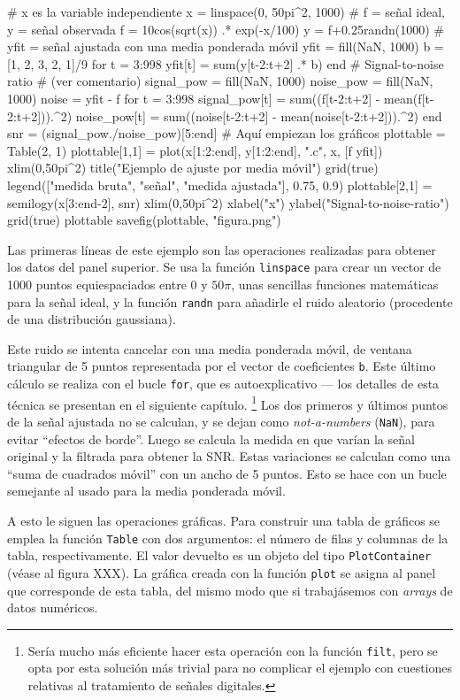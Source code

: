 ﻿\documentclass{article}
\newcommand{\jl}{\texttt}
\begin{document}
# x es la variable independiente
x = linspace(0, 50pi^2, 1000)
# f = señal ideal, y = señal observada
f = 10cos(sqrt(x)) .* exp(-x/100)
y = f+0.25randn(1000)
# yfit = señal ajustada con una media ponderada móvil
yfit = fill(NaN, 1000)
b = [1, 2, 3, 2, 1]/9
for t = 3:998
  yfit[t] = sum(y[t-2:t+2] .* b)
end
# Signal-to-noise ratio
# (ver comentario)
signal_pow = fill(NaN, 1000)
noise_pow = fill(NaN, 1000)
noise = yfit - f
for t = 3:998
  signal_pow[t] = sum((f[t-2:t+2] - mean(f[t-2:t+2])).^2)
  noise_pow[t] = sum((noise[t-2:t+2] - mean(noise[t-2:t+2])).^2)
end
snr = (signal_pow./noise_pow)[5:end]
# Aquí empiezan los gráficos
plottable = Table(2, 1)
plottable[1,1] = plot(x[1:2:end], y[1:2:end], ".c", x, [f yfit])
xlim(0,50pi^2)
title("Ejemplo de ajuste por media móvil")
grid(true)
legend(["medida bruta", "señal", "medida ajustada"], 0.75, 0.9)
plottable[2,1] = semilogy(x[3:end-2], snr)
xlim(0,50pi^2)
xlabel("x")
ylabel("Signal-to-noise-ratio")
grid(true)
plottable
savefig(plottable, "figura.png")

Las primeras líneas de este ejemplo son las operaciones realizadas para obtener los datos del panel superior. Se usa la función \jl{linspace} para crear un vector de 1000 puntos equiespaciados entre $0$ y $50\pi$, unas sencillas funciones matemáticas para la señal ideal, y la función \jl{randn} para añadirle el ruido aleatorio (procedente de una distribución gaussiana).

Este ruido se intenta cancelar con una media ponderada móvil, de ventana triangular de 5 puntos representada por el vector de coeficientes \jl{b}. Este último cálculo se realiza con el bucle \jl{for}, que es autoexplicativo --- los detalles de esta técnica se presentan en  el siguiente capítulo.%
\footnote{%
Sería mucho más eficiente hacer esta operación con la
función \jl{filt}, pero se opta por esta solución más trivial para no
complicar el ejemplo con cuestiones relativas al tratamiento de señales digitales.%
}
Los dos primeros y últimos puntos de la señal ajustada no se calculan, y se dejan como \emph{not-a-numbers} (\jl{NaN}), para evitar ``efectos de borde''. Luego se calcula la medida en que varían la señal original y la filtrada para obtener la SNR. Estas variaciones se calculan como una ``suma de cuadrados móvil'' con un ancho de 5 puntos. Esto se hace con un bucle semejante al usado para la media ponderada móvil.

A esto le siguen las operaciones gráficas. Para construir una tabla de gráficos se emplea la función \jl{Table} con dos argumentos: el número de filas y columnas de la tabla, respectivamente. El valor devuelto es un objeto del tipo \jl{PlotContainer} (véase al figura XXX). La gráfica creada con la función \jl{plot} se asigna al panel que corresponde de esta tabla, del mismo modo que si trabajásemos con \emph{arrays} de datos numéricos.
\end{document}
